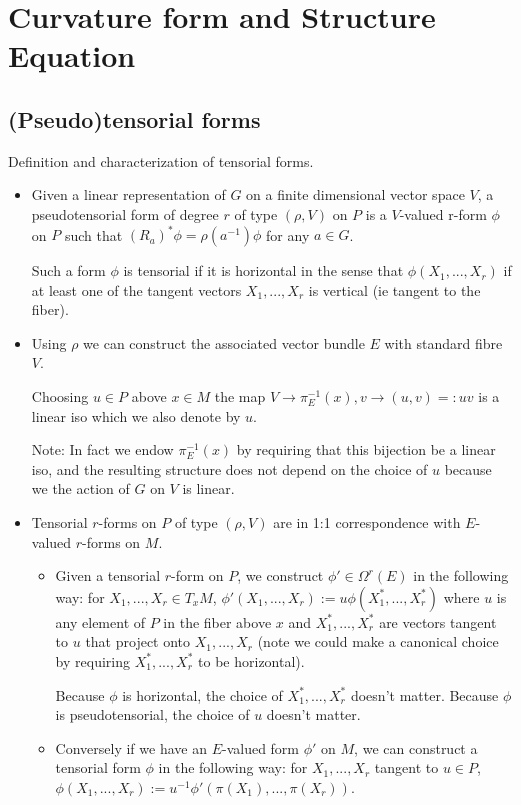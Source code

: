 \documentclass{report}
\theoremstyle{definition}
\begin{document}
\section{Curvature form and Structure Equation}

\subsection{(Pseudo)tensorial forms}

Definition and characterization of tensorial forms.
\begin{itemize}
    \item Given a linear representation of $G$ on a finite dimensional vector space $V$, a pseudotensorial form of degree $r$ of type $(\rho,V)$ on $P$ is a $V$-valued r-form $\phi$ on $P$ such that $(R_a)^*\phi=\rho(a^{-1})\phi$ for any $a\in G$.

    Such a form $\phi$ is tensorial if it is horizontal in the sense that $\phi(X_1,...,X_r)$ if at least one of the tangent vectors $X_1,...,X_r$ is vertical (ie tangent to the fiber).
    \item Using $\rho$ we can construct the associated vector bundle $E$ with standard fibre $V$.

    Choosing $u\in P$ above $x\in M$ the map $V\to\pi_E^{-1}(x),v\to(u,v)=:uv$ is a linear iso which we also denote by $u$.

    Note: In fact we endow $\pi_E^{-1}(x)$ by requiring that this bijection be a linear iso, and the resulting structure does not depend on the choice of $u$ because we the action of $G$ on $V$ is linear.
    \item Tensorial $r$-forms on $P$ of type $(\rho,V)$ are in 1:1 correspondence with $E$-valued $r$-forms on $M$.
    \begin{itemize}
        \item Given a tensorial $r$-form on $P$, we construct $\phi'\in\Omega^r(E)$ in the following way: for $X_1,...,X_r\in T_xM$, $\phi'(X_1,...,X_r):=u\phi(X^*_1,...,X^*_r)$ where $u$ is any element of $P$ in the fiber above $x$ and $X^*_1,...,X^*_r$ are vectors tangent to $u$ that project onto $X_1,...,X_r$ (note we could make a canonical choice by requiring $X^*_1,...,X^*_r$ to be horizontal).

        Because $\phi$ is horizontal, the choice of $X^*_1,...,X^*_r$ doesn't matter. Because $\phi$ is pseudotensorial, the choice of $u$ doesn't matter.

        \item Conversely if we have an $E$-valued form $\phi'$ on $M$, we can construct a tensorial form $\phi$ in the following way: for $X_1,...,X_r$ tangent to $u\in P$, $\phi(X_1,...,X_r):=u^{-1}\phi'(\pi(X_1),...,\pi(X_r))$.


\end{itemize}
\end{itemize}
\end{document}
